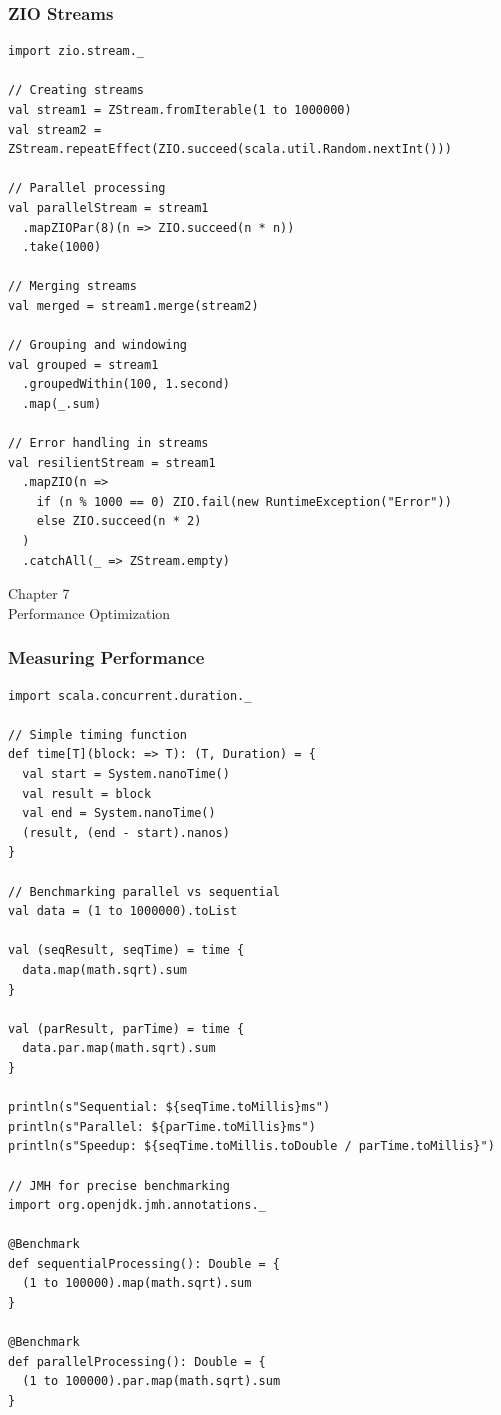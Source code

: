 \documentclass{beamer}
\newcommand{\chapterpage}[2]{
  \begin{frame}[plain]
    \centering
    \vfill
    {\usebeamerfont{title}\usebeamercolor[fg]{title}Chapter #1\\}
    \vspace{0.5cm}
    {\usebeamerfont{subtitle}#2}
    \vfill
  \end{frame}
}
\begin{document}
\begin{frame}[fragile]
\frametitle{ZIO Streams}

\begin{lstlisting}[style=scalaStyle]
import zio.stream._

// Creating streams
val stream1 = ZStream.fromIterable(1 to 1000000)
val stream2 = ZStream.repeatEffect(ZIO.succeed(scala.util.Random.nextInt()))

// Parallel processing
val parallelStream = stream1
  .mapZIOPar(8)(n => ZIO.succeed(n * n))
  .take(1000)

// Merging streams
val merged = stream1.merge(stream2)

// Grouping and windowing
val grouped = stream1
  .groupedWithin(100, 1.second)
  .map(_.sum)

// Error handling in streams
val resilientStream = stream1
  .mapZIO(n => 
    if (n % 1000 == 0) ZIO.fail(new RuntimeException("Error"))
    else ZIO.succeed(n * 2)
  )
  .catchAll(_ => ZStream.empty)
\end{lstlisting}

\end{frame}

\chapterpage{7}{Performance Optimization}

\begin{frame}[fragile]
\frametitle{Measuring Performance}

\begin{lstlisting}[style=scalaStyle]
import scala.concurrent.duration._

// Simple timing function
def time[T](block: => T): (T, Duration) = {
  val start = System.nanoTime()
  val result = block
  val end = System.nanoTime()
  (result, (end - start).nanos)
}

// Benchmarking parallel vs sequential
val data = (1 to 1000000).toList

val (seqResult, seqTime) = time {
  data.map(math.sqrt).sum
}

val (parResult, parTime) = time {
  data.par.map(math.sqrt).sum
}

println(s"Sequential: ${seqTime.toMillis}ms")
println(s"Parallel: ${parTime.toMillis}ms")
println(s"Speedup: ${seqTime.toMillis.toDouble / parTime.toMillis}")

// JMH for precise benchmarking
import org.openjdk.jmh.annotations._

@Benchmark
def sequentialProcessing(): Double = {
  (1 to 100000).map(math.sqrt).sum
}

@Benchmark
def parallelProcessing(): Double = {
  (1 to 100000).par.map(math.sqrt).sum
}
\end{lstlisting}

\end{frame}
\end{document}
